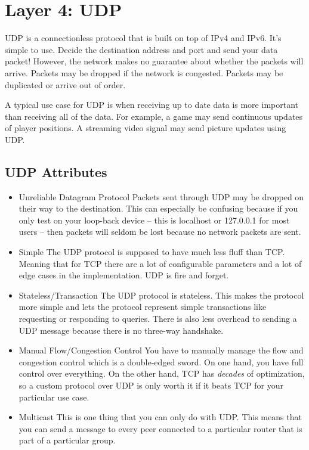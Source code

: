 \section{Layer 4: UDP}

UDP is a connectionless protocol that is built on top of IPv4 and IPv6.
It's simple to use.
Decide the destination address and port and send your data packet!
However, the network makes no guarantee about whether the packets will arrive.
Packets may be dropped if the network is congested.
Packets may be duplicated or arrive out of order.

A typical use case for UDP is when receiving up to date data is more important than receiving all of the data.
For example, a game may send continuous updates of player positions.
A streaming video signal may send picture updates using UDP.

\subsection{UDP Attributes}

\begin{itemize}
\item Unreliable Datagram Protocol
  Packets sent through UDP may be dropped on their way to the destination.
  This can especially be confusing because if you only test on your loop-back device -- this is localhost or 127.0.0.1 for most users -- then packets will seldom be lost because no network packets are sent.
\item Simple
  The UDP protocol is supposed to have much less fluff than TCP.
  Meaning that for TCP there are a lot of configurable parameters and a lot of edge cases in the implementation.
  UDP is fire and forget.
\item Stateless/Transaction
  The UDP protocol is stateless.
  This makes the protocol more simple and lets the protocol represent simple transactions like requesting or responding to queries.
  There is also less overhead to sending a UDP message because there is no three-way handshake.
\item Manual Flow/Congestion Control
  You have to manually manage the flow and congestion control which is a double-edged sword.
  On one hand, you have full control over everything.
  On the other hand, TCP has \textit{decades} of optimization, so a custom protocol over UDP is only worth it if it beats TCP for your particular use case.
\item Multicast
  This is one thing that you can only do with UDP.
  This means that you can send a message to every peer connected to a particular router that is part of a particular group.
\end{itemize}

